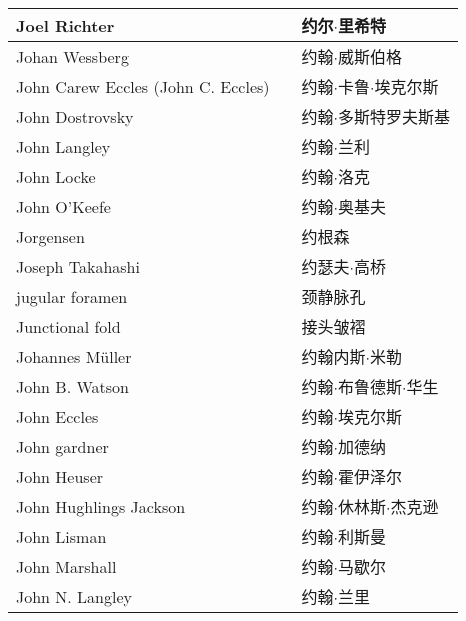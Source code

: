 \begin{longtable}{lll}
	\midrule
	Joel Richter   && 约尔$\cdot$里希特  \\
	
	\midrule
	Johan Wessberg   && 约翰$\cdot$威斯伯格  \\
	
	\midrule
	John Carew Eccles (John C. Eccles)   && 约翰$\cdot$卡鲁$\cdot$埃克尔斯  \\
	
	\midrule
	John Dostrovsky   && 约翰$\cdot$多斯特罗夫斯基  \\
	
	\midrule
	John Langley   && 约翰$\cdot$兰利  \\
	
	\midrule
	John Locke   && 约翰$\cdot$洛克  \\
	
	\midrule
	John O’Keefe   && 约翰$\cdot$奥基夫  \\
	
	\midrule
	Jorgensen   && 约根森  \\
	
	\midrule
	Joseph Takahashi   && 约瑟夫$\cdot$高桥  \\
	
	\midrule
	jugular foramen   && 颈静脉孔  \\
	
	\midrule
	Junctional fold   && 接头皱褶  \\
	
	\midrule
	Johannes Müller   && 约翰内斯$\cdot$米勒  \\
	
	\midrule
	John B. Watson   && 约翰$\cdot$布鲁德斯$\cdot$华生  \\
	
	\midrule
	John Eccles   && 约翰$\cdot$埃克尔斯  \\
	
	\midrule
	John gardner   && 约翰$\cdot$加德纳  \\
	
	\midrule
	John Heuser   && 约翰$\cdot$霍伊泽尔  \\
	
	\midrule
	John Hughlings Jackson   && 约翰$\cdot$休林斯$\cdot$杰克逊  \\
	
	\midrule
	John Lisman   && 约翰$\cdot$利斯曼  \\
	
	\midrule
	John Marshall   && 约翰$\cdot$马歇尔  \\
	
	\midrule
	John N. Langley   && 约翰$\cdot$兰里  \\
	

\end{longtable}
